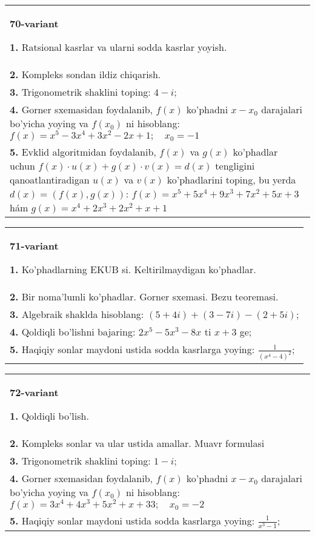\documentclass{article}
\begin{document}
\begin{tabular}{m{17cm}}
\textbf{70-variant}
\newline

\textbf{1.} Ratsional kasrlar va ularni sodda kasrlar yoyish. \\
\textbf{2.} Kompleks sondan ildiz chiqarish. \\
\textbf{3.} Trigonometrik shaklini toping: $4-i$; \\
\textbf{4.} Gorner sxemasidan foydalanib, $f(x)$ ko’phadni $x-x_0$ darajalari bo’yicha yoying va $f\left(x_0\right)$ ni hisoblang: $f(x)=x^5-3 x^4+3 x^2-2 x+1 ; \quad x_0=-1$ \\
\textbf{5.} Evklid algoritmidan foydalanib, $f(x)$ va $g(x)$ ko’phadlar uchun $f(x) \cdot u(x)+g(x) \cdot v(x)=d(x)$ tengligini qanoatlantiradigan $u(x)$ va $v(x)$ ko’phadlarini toping, bu yerda $d(x)=(f(x), g(x))$:  $f(x)=x^5+5 x^4+9 x^3+7 x^2+5 x+3$ hám $g(x)=x^4+2 x^3+2 x^2+x+1$ \\

\end{tabular}
\vspace{1cm}


\begin{tabular}{m{17cm}}
\textbf{71-variant}
\newline

\textbf{1.} Ko’phadlarning EKUB si. Keltirilmaydigan ko’phadlar. \\
\textbf{2.} Bir noma’lumli ko’phadlar. Gorner sxemasi. Bezu teoremasi.  \\
\textbf{3.} Algebraik shaklda hisoblang: $(5+4 i)+(3-7 i)-(2+5 i)$; \\
\textbf{4.} Qoldiqli bo’lishni bajaring: $2 x^5-5 x^3-8 x$ ti $x+3$ ge; \\
\textbf{5.} Haqiqiy sonlar maydoni ustida sodda kasrlarga yoying:  $\frac{1}{\left(x^4-4\right)^2}$; \\

\end{tabular}
\vspace{1cm}


\begin{tabular}{m{17cm}}
\textbf{72-variant}
\newline

\textbf{1.} Qoldiqli bo’lish.  \\
\textbf{2.} Kompleks sonlar va ular ustida amallar. Muavr formulasi  \\
\textbf{3.} Trigonometrik shaklini toping: $1-i$; \\
\textbf{4.} Gorner sxemasidan foydalanib, $f(x)$ ko’phadni $x-x_0$ darajalari bo’yicha yoying va $f\left(x_0\right)$ ni hisoblang: $f(x)=3 x^4+4 x^3+5 x^2+x+33 ; \quad x_0=-2$ \\
\textbf{5.} Haqiqiy sonlar maydoni ustida sodda kasrlarga yoying:  $\frac{1}{x^3-1}$; \\

\end{tabular}
\vspace{1cm}
\end{document}

